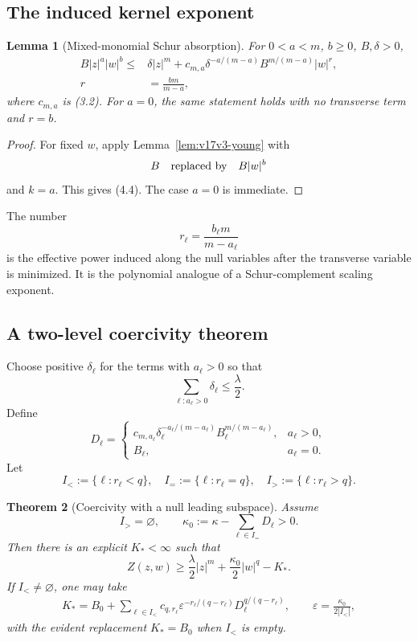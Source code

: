 \documentclass[11pt]{article}
\newtheorem{theorem}{Theorem}[section]
\newtheorem{lemma}[theorem]{Lemma}
\theoremstyle{remark}
\begin{document}
\subsection{The induced kernel exponent}

\begin{lemma}[Mixed-monomial Schur absorption]
\label{lem:v17v4-mixed}
For \(0<a<m\), \(b\geq0\), \(B,\delta>0\),
\[
\begin{split}
 B|z|^a|w|^b
 \leq&
 \delta|z|^m+
 c_{m,a}\delta^{-a/(m-a)}
 B^{m/(m-a)}
 |w|^{r},\\
 r&=\frac{bm}{m-a},                                \tag{4.4}
\end{split}
\]
where \(c_{m,a}\) is (3.2).  For \(a=0\), the same statement holds
with no transverse term and \(r=b\).
\end{lemma}

\begin{proof}
For fixed \(w\), apply Lemma~\ref{lem:v17v3-young} with
\[
 B\quad\hbox{replaced by}\quad B|w|^b
\]
and \(k=a\).  This gives (4.4).  The case \(a=0\) is immediate.
\end{proof}

The number
\[
 r_\ell=\frac{b_\ell m}{m-a_\ell}                  \tag{4.5}
\]
is the effective power induced along the null variables after the
transverse variable is minimized.  It is the polynomial analogue of
a Schur-complement scaling exponent.

\subsection{A two-level coercivity theorem}

Choose positive \(\delta_\ell\) for the terms with \(a_\ell>0\) so
that
\[
 \sum_{\ell:a_\ell>0}\delta_\ell\leq\frac{\lambda}{2}.
                                                               \tag{4.6}
\]
Define
\[
 D_\ell=
 \begin{cases}
 c_{m,a_\ell}\delta_\ell^{-a_\ell/(m-a_\ell)}
 B_\ell^{m/(m-a_\ell)},&a_\ell>0,\\
 B_\ell,&a_\ell=0.
 \end{cases}                                       \tag{4.7}
\]
Let
\[
 I_<:=\{\ell:r_\ell<q\},\quad
 I_=:=\{\ell:r_\ell=q\},\quad
 I_>:=\{\ell:r_\ell>q\}.                            \tag{4.8}
\]

\begin{theorem}[Coercivity with a null leading subspace]
\label{thm:v17v4-two-level}
Assume
\[
 I_>=\varnothing,\qquad
 \kappa_0:=
 \kappa-\sum_{\ell\in I_=}D_\ell>0.                \tag{4.9}
\]
Then there is an explicit \(K_*<\infty\) such that
\[
 Z(z,w)
 \geq
 \frac{\lambda}{2}|z|^m+
 \frac{\kappa_0}{2}|w|^q-K_*.                      \tag{4.10}
\]
If \(I_<\ne\varnothing\), one may take
\[
\begin{split}
 K_*=
 B_0+
 \sum_{\ell\in I_<}
 c_{q,r_\ell}
 \varepsilon^{-r_\ell/(q-r_\ell)}
 D_\ell^{q/(q-r_\ell)},\qquad
 \varepsilon=\frac{\kappa_0}{2|I_<|},              \tag{4.11}
\end{split}
\]
with the evident replacement \(K_*=B_0\) when \(I_<\) is empty.
\end{theorem}
\end{document}
